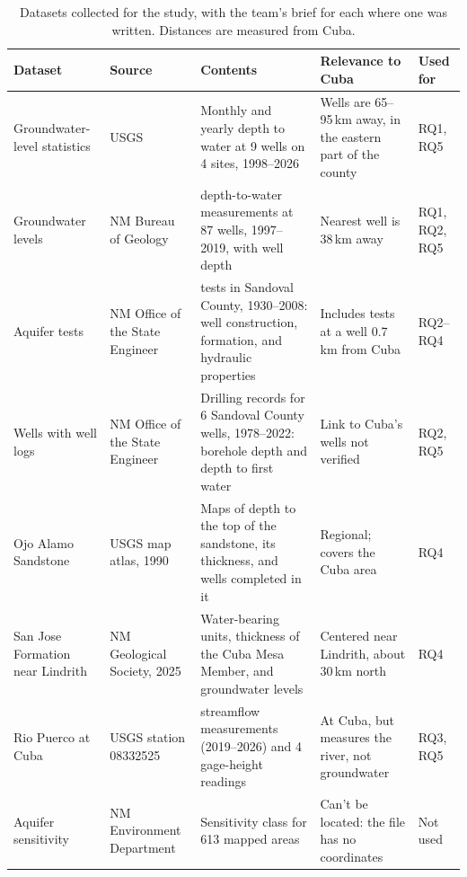 \documentclass[10pt,twocolumn,letterpaper]{article}
\begin{document}
\begin{table}[t]
  \caption{Datasets collected for the study, with the team's brief for each where one was
  written. Distances are measured from Cuba.}
  \label{tab:datasets}
  \footnotesize
  \begin{tabularx}{\textwidth}{@{}>{\raggedright}p{0.9in}>{\raggedright}p{0.95in}
      >{\raggedright\arraybackslash}X>{\raggedright\arraybackslash}X l@{}}
    \toprule
    \textbf{Dataset} & \textbf{Source} & \textbf{Contents} & \textbf{Relevance to Cuba} & \textbf{Used for} \\
    \midrule
    Groundwater-level statistics \citep{gonzales_brief1} & USGS & Monthly and yearly depth to water at 9 wells on 4 sites,
      1998--2026 & Wells are 65--95\,km away, in the eastern part of the county & RQ1, RQ5 \\
    Groundwater levels \citep{gonzales_brief2} & NM Bureau of Geology & 456 depth-to-water measurements at 87 wells,
      1997--2019, with well depth & Nearest well is 38\,km away & RQ1, RQ2, RQ5 \\
    Aquifer tests & NM Office of the State Engineer & 179 tests in Sandoval County, 1930--2008:
      well construction, formation, and hydraulic properties & Includes tests at a well
      0.7\,km from Cuba & RQ2--RQ4 \\
    Wells with well logs \citep{gonzales_brief7} & NM Office of the State Engineer & Drilling records for 6 Sandoval
      County wells, 1978--2022: borehole depth and depth to first water & Link to Cuba's wells
      not verified & RQ2, RQ5 \\
    Ojo Alamo Sandstone \citep{gonzales_brief5} & USGS map atlas, 1990 & Maps of depth to the top of the sandstone, its
      thickness, and wells completed in it & Regional; covers the Cuba area & RQ4 \\
    San Jose Formation near Lindrith \citep{gonzales_brief6} & NM Geological Society, 2025 & Water-bearing units,
      thickness of the Cuba Mesa Member, and groundwater levels & Centered near Lindrith, about
      30\,km north & RQ4 \\
    Rio Puerco at Cuba \citep{gonzales_brief4} & USGS station 08332525 & 10 streamflow measurements (2019--2026) and
      4 gage-height readings & At Cuba, but measures the river, not groundwater & RQ3, RQ5 \\
    Aquifer sensitivity \citep{gonzales_brief3} & NM Environment Department & Sensitivity class for 613 mapped areas & Can't be
      located: the file has no coordinates & Not used \\
    \bottomrule
  \end{tabularx}
\end{table}
\end{document}
